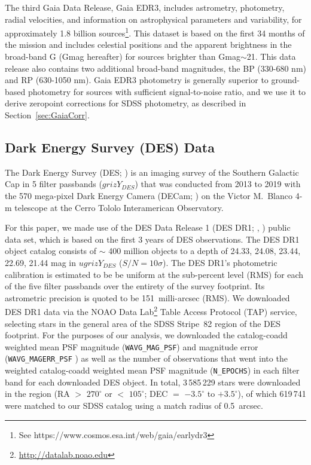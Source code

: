 \documentclass[fleqn,usenatbib]{mnras}
\begin{document}
The third Gaia Data Release, Gaia EDR3, includes astrometry, photometry, radial velocities, and information on astrophysical parameters and variability, for approximately 1.8 billion sources\footnote{See https://www.cosmos.esa.int/web/gaia/earlydr3}. This dataset is based on the first 34 months of the mission and includes celestial positions and the apparent brightness in the broad-band G (Gmag hereafter) for sources brighter than Gmag$\sim$21.  This data release also contains two additional broad-band magnitudes, the BP (330-680 nm) and RP (630-1050 nm). Gaia EDR3 photometry is generally superior to ground-based photometry for sources with sufficient signal-to-noise ratio, and we use it to derive zeropoint corrections for SDSS photometry, as described in Section~\ref{sec:GaiaCorr}. 
 

\subsection{Dark Energy Survey (DES) Data} \label{ssec:des}


The Dark Energy Survey (DES; \citealt{2016MNRAS.460.1270D}) is an imaging survey of the Southern Galactic Cap in 5 filter passbands ($grizY_{DES}$) that was conducted from 2013 to 2019 with the 570 mega-pixel Dark Energy Camera (DECam;
\citealt{2008arXiv0810.3600H,2015AJ....150..150F}) on the Victor M.\ Blanco 4-m telescope at the Cerro Tololo Interamerican
Observatory.

For this paper, we made use of the DES Data Release 1 (DES DR1; \citealt{Morg2018}, \citealt{2018ApJS..239...18A}) public data set, which is based on the first 3 years of DES observations.  The DES DR1 object catalog consists of $\sim$ 400 million objects to a depth of 24.33, 24.08, 23.44, 22.69, 21.44 mag in $ugrizY_{DES}$ ($S/N=10\sigma$).  The DES DR1's photometric calibration is estimated to be be uniform at the sub-percent level (RMS) for each of the five filter passbands over the entirety of the survey footprint.  Its astrometric precision is quoted to be 151~milli-arcsec (RMS).  We downloaded DES DR1 data via the NOAO
Data Lab\footnote{\url{http://datalab.noao.edu}} Table Access Protocol (TAP) service, selecting stars in the general area of the SDSS Stripe~82 region of the DES footprint.  For the purposes of our analysis, we downloaded the catalog-coadd weighted mean PSF magnitude ({\tt WAVG\_MAG\_PSF}) and magnitude error ({\tt WAVG\_MAGERR\_PSF} ) as well as the number of observations that went into the weighted catalog-coadd weighted mean PSF magnitude ({\tt N\_EPOCHS}) in each filter band for each downloaded DES object.  In total, 3\,585\,229 stars were downloaded in the region (RA $>$ $270^{\circ}$ or $<$  $105^{\circ}$; DEC $=$ $-3.5^{\circ}$ to $+3.5^{\circ}$), of which 619\,741 were matched to our SDSS catalog using a match radius of 0.5~arcsec.
\end{document}
